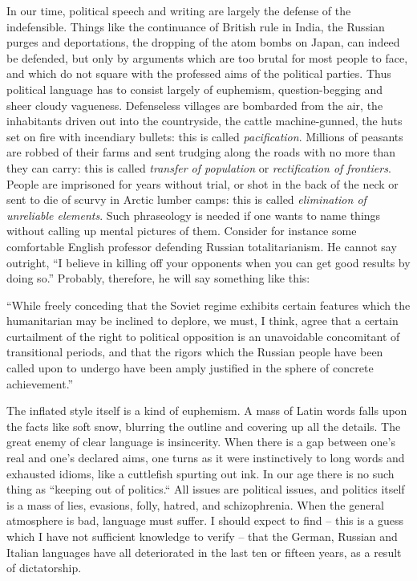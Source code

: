 \documentclass[article,twoside,a4paper]{memoir}
\begin{document}
In our time, political speech and writing are largely the defense of the indefensible.
Things like the continuance of British rule in India, the Russian purges and
deportations, the dropping of the atom bombs on Japan, can indeed be defended,
but only by arguments which are too brutal for most people to face, and which
do not square with the professed aims of the political parties. Thus political
language has to consist largely of euphemism, question-begging and sheer cloudy
vagueness. Defenseless villages are bombarded from the air, the inhabitants
driven out into the countryside, the cattle machine-gunned, the huts set on
fire with incendiary bullets: this is called \emph{pacification}. Millions of
peasants are robbed of their farms and sent trudging along the roads with no
more than they can carry: this is called \emph{transfer of population} or \emph{rectification
  of frontiers}. People are imprisoned for years without trial, or shot in
the back of the neck or sent to die of scurvy in Arctic lumber camps: this is
called \emph{elimination of unreliable elements}. Such phraseology is needed
if one wants to name things without calling up mental pictures of them. Consider
for instance some comfortable English professor defending Russian totalitarianism.
He cannot say outright, ``I believe in killing off your opponents when you
can get good results by doing so.'' Probably, therefore, he will say something
like this:

``While freely conceding that the Soviet regime exhibits certain features
which the humanitarian may be inclined to deplore, we must, I think, agree that
a certain curtailment of the right to political opposition is an unavoidable
concomitant of transitional periods, and that the rigors which the Russian people
have been called upon to undergo have been amply justified in the sphere of
concrete achievement.''

The inflated style itself is a kind of euphemism. A mass of Latin words falls upon the
facts like soft snow, blurring the outline and covering up all the details. The great
enemy of clear language is insincerity. When there is a gap between one's real and one's
declared aims, one turns as it were instinctively to long words and exhausted idioms, like
a cuttlefish spurting out ink. In our age there is no such thing as ``keeping out of
politics.`` All issues are political issues, and politics itself is a mass of lies,
evasions, folly, hatred, and schizophrenia. When the general atmosphere is bad, language
must suffer. I should expect to find -- this is a guess which I have not sufficient
knowledge to verify -- that the German, Russian and Italian languages have all
deteriorated in the last ten or fifteen years, as a result of dictatorship.
\end{document}

